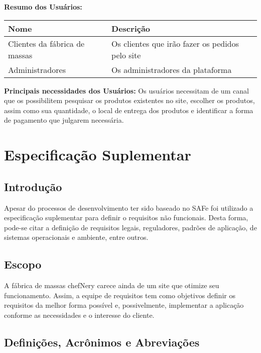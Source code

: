 \begin{apendicesenv}
\begin{tabular}{|p{2in}|p{2in}|p{2in}|}
\end{tabular}

\textbf{Resumo dos Usuários:}  \\

\begin{tabular}{|l|p{3in}|}
  \hline
  \textbf{Nome} & \textbf{Descrição} \\ \hline
  Clientes da fábrica de massas & Os clientes que irão fazer os pedidos pelo site \\ \hline
  Administradores & Os administradores da plataforma \\ \hline

\end{tabular}

\textbf{Principais necessidades dos Usuários:} Os usuários necessitam de um canal que os possibilitem pesquisar os produtos existentes no site, escolher os produtos, assim como sua quantidade, o local de entrega dos produtos e identificar a forma de pagamento que julgarem necessária.   \\


\chapter{Especificação Suplementar}

{\large {\section { Introdução \\ } } }

Apesar do processos de desenvolvimento ter sido baseado no SAFe foi utilizado a especificação suplementar para definir o requisitos não funcionais. Desta forma, pode-se citar a definição de requisitos legais, reguladores, padrões de aplicação, de sistemas operacionais e ambiente, entre outros.

{\large {\section { Escopo \\ } } }

A fábrica de massas chefNery carece ainda de um site que otimize seu funcionamento. Assim, a equipe de requisitos tem como objetivos definir os requisitos da melhor forma possível e, possivelmente, implementar a aplicação conforme as necessidades e o interesse do cliente. 

{\large {\section { Definições, Acrônimos e Abreviações \\ } } }


\end{apendicesenv}

